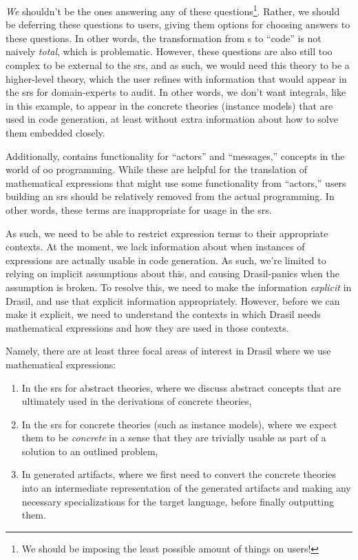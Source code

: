 \textit{We} shouldn't be the ones answering any of these questions\footnote{We
should be imposing the least possible amount of things on users!}. Rather, we
should be deferring these questions to users, giving them options for choosing
answers to these questions. In other words, the transformation from \Expr{}s to
``code'' is not naively \textit{total}, which is problematic. However, these
questions are also still too complex to be external to the \acs{srs}, and as
such, we would need this theory to be a higher-level theory, which the user
refines with information that would appear in the \acs{srs} for domain-experts
to audit. In other words, we don't want integrals, like in this example, to
appear in the concrete theories (instance models) that are used in code
generation, at least without extra information about how to solve them embedded
closely.

Additionally, \Expr{} contains functionality for ``actors'' and ``messages,''
concepts in the world of \acs{oo} programming. While these are helpful for the
translation of mathematical expressions that might use some functionality from
``actors,'' users building an \acs{srs} should be relatively removed from the
actual programming. In other words, these terms are inappropriate for usage in
the \acs{srs}.

As such, we need to be able to restrict expression terms to their appropriate
contexts. At the moment, we lack information about when instances of expressions
are actually usable in code generation. As such, we're limited to relying on
implicit assumptions about this, and causing Drasil-panics when the assumption
is broken. To resolve this, we need to make the information \textit{explicit} in
Drasil, and use that explicit information appropriately. However, before we can
make it explicit, we need to understand the contexts in which Drasil needs
mathematical expressions and how they are used in those contexts.

Namely, there are at least three focal areas of interest in Drasil where we use
mathematical expressions:

\begin{enumerate}

    \item In the \acs{srs} for abstract theories, where we discuss abstract
          concepts that are ultimately used in the derivations of concrete
          theories,

    \item In the \acs{srs} for concrete theories (such as instance models),
          where we expect them to be \textit{concrete} in a sense that they are
          trivially usable as part of a solution to an outlined problem,

    \item In generated artifacts, where we first need to convert the
          concrete theories into an intermediate representation of the generated
          artifacts and making any necessary specializations for the target
          language, before finally outputting them.

\end{enumerate}

